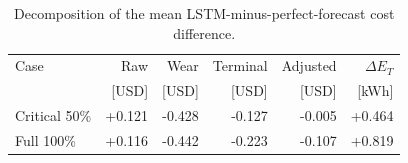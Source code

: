 \begin{table}[t]
\centering
\small
\caption{Decomposition of the mean LSTM-minus-perfect-forecast cost difference.}
\label{tab:forecast-decomposition}
\begin{tabular}{lrrrrr}
\toprule
Case & Raw & Wear & Terminal & Adjusted & $\Delta E_T$ \\
 & [USD] & [USD] & [USD] & [USD] & [kWh] \\
\midrule
Critical 50\% & +0.121 & -0.428 & -0.127 & -0.005 & +0.464 \\
Full 100\% & +0.116 & -0.442 & -0.223 & -0.107 & +0.819 \\
\bottomrule
\end{tabular}
\par\vspace{1mm}{\footnotesize Negative values favor LSTM. Wear is a component of raw cost; terminal adjustment is applied ex post. $\Delta E_T$ is the LSTM-minus-perfect terminal-energy difference.}
\end{table}
